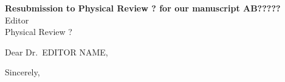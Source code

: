 \documentclass[11pt]{letter}
\begin{document}
\begin{letter}{
    \textbf{Resubmission to Physical Review ? for our manuscript AB?????}\\
            Editor\\
            Physical Review ?}

    \opening{Dear Dr.~{EDITOR NAME},}
    

    \closing{Sincerely,}


\end{letter}
\end{document}
